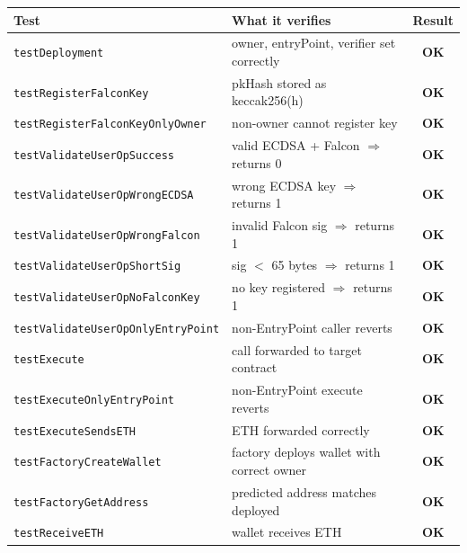 \documentclass[11pt,a4paper]{article}
\begin{document}
\begin{center}
\begin{tabular}{llc}
\toprule
\textbf{Test} & \textbf{What it verifies} & \textbf{Result} \\
\midrule
\texttt{testDeployment}                   & owner, entryPoint, verifier set correctly & \textcolor{pass-green}{\textbf{OK}} \\
\texttt{testRegisterFalconKey}            & pkHash stored as keccak256(h)             & \textcolor{pass-green}{\textbf{OK}} \\
\texttt{testRegisterFalconKeyOnlyOwner}   & non-owner cannot register key             & \textcolor{pass-green}{\textbf{OK}} \\
\texttt{testValidateUserOpSuccess}        & valid ECDSA + Falcon $\Rightarrow$ returns 0 & \textcolor{pass-green}{\textbf{OK}} \\
\texttt{testValidateUserOpWrongECDSA}     & wrong ECDSA key $\Rightarrow$ returns 1   & \textcolor{pass-green}{\textbf{OK}} \\
\texttt{testValidateUserOpWrongFalcon}    & invalid Falcon sig $\Rightarrow$ returns 1& \textcolor{pass-green}{\textbf{OK}} \\
\texttt{testValidateUserOpShortSig}       & sig $<$ 65 bytes $\Rightarrow$ returns 1  & \textcolor{pass-green}{\textbf{OK}} \\
\texttt{testValidateUserOpNoFalconKey}    & no key registered $\Rightarrow$ returns 1 & \textcolor{pass-green}{\textbf{OK}} \\
\texttt{testValidateUserOpOnlyEntryPoint} & non-EntryPoint caller reverts             & \textcolor{pass-green}{\textbf{OK}} \\
\texttt{testExecute}                      & call forwarded to target contract         & \textcolor{pass-green}{\textbf{OK}} \\
\texttt{testExecuteOnlyEntryPoint}        & non-EntryPoint execute reverts            & \textcolor{pass-green}{\textbf{OK}} \\
\texttt{testExecuteSendsETH}              & ETH forwarded correctly                   & \textcolor{pass-green}{\textbf{OK}} \\
\texttt{testFactoryCreateWallet}          & factory deploys wallet with correct owner & \textcolor{pass-green}{\textbf{OK}} \\
\texttt{testFactoryGetAddress}            & predicted address matches deployed        & \textcolor{pass-green}{\textbf{OK}} \\
\texttt{testReceiveETH}                   & wallet receives ETH                       & \textcolor{pass-green}{\textbf{OK}} \\
\bottomrule
\end{tabular}
\end{center}
\end{document}

